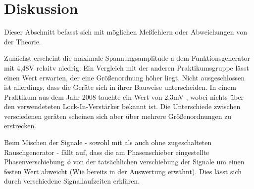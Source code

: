 \section{Diskussion}
\label{sec:Diskussion}
Dieser Abschnitt befasst sich mit möglichen Meßfehlern oder Abweichungen
von der Theorie.

Zunächst erscheint die maximale Spannungsamplitude a dem Funktionsgenerator mit
4,48V relaitv niedrig. Ein Vergleich mit der anderen Praktikumsgruppe lässt
einen Wert erwarten, der eine Größenordnung höher liegt. Nicht ausgeschlossen
ist allerdings, dass die Geräte sich in ihrer Bauweise unterscheiden. In
einem Praktikum aus dem Jahr 2008 tauchte ein Wert von 2,3mV , wobei nichts
über den verwendeteten Lock-In-Verstärker bekannt ist. Die Unterschiede
zwischen versciedenen geräten scheinen sich aber über mehrere Größenordnungen
zu erstrecken.

Beim Mischen der Signale - sowohl mit als auch ohne zugeschalteten
Rauschgenerator - fällt auf, dass die am Phasenschieber eingestellte
Phasenverschiebung $\phi$ von der tatsächlichen verschiebung der Signale
um einen festen Wert abweicht (Wie bereits in der Auswertung erwähnt).
Dies lässt sich durch verschiedene Signallaufzeiten erklären.
